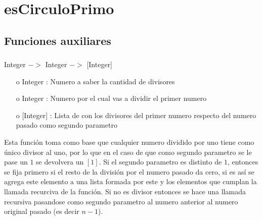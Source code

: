 \documentclass[10pt,journal]{IEEEtran}
\begin{document}
\section{esCirculoPrimo}
\subsection{Funciones auxiliares}
\subsubsection{\color{Red}{divisoresHasta}}
\begin{description}[style=nextline]
        \item[\color{Green}{Signatura}] Integer $->$ Integer $->$ [Integer]
        
        \begin{itemize} 
        \item [o]  Integer : Numero a saber la cantidad de divisores
        \item [o]  Integer : Numero por el cual vas a dividir el primer numero
        \item [o] [Integer] : Lista de con los divisores del primer numero respecto del numero pasado como segundo parametro
        \end{itemize}        
        
        \item[\color{Green}{Descripción}] Esta función toma como base que cualquier numero dividido por uno tiene como único divisor al uno, por lo que en el caso de que como segundo parametro se le pase un $1$ se devolvera un $[1]$. Si el segundo parametro es distinto de $1$, entonces se fija primero si el resto de la división por el numero pasado da cero, si es así se agrega este elemento a una lista formada por este y los elementos que cumplan la llamada recurciva de la función. Si no es divisor entonces se hace una llamada recursiva pasandose como segundo parametro al numero anterior al numero original pasado (es decir $n-1$).
\end{description}
\end{document}
